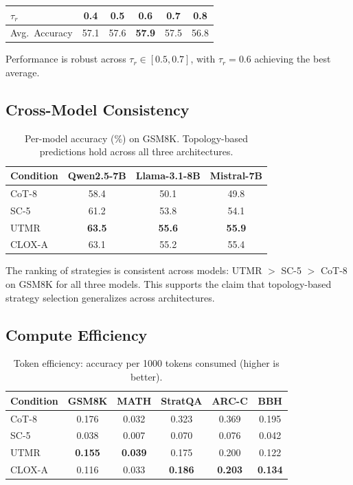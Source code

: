 \documentclass{article}
\begin{document}
\begin{center}
\small
\begin{tabular}{lccccc}
\toprule
$\tau_r$ & 0.4 & 0.5 & 0.6 & 0.7 & 0.8 \\
\midrule
Avg.\ Accuracy & 57.1 & 57.6 & \textbf{57.9} & 57.5 & 56.8 \\
\bottomrule
\end{tabular}
\end{center}

Performance is robust across $\tau_r \in [0.5, 0.7]$, with $\tau_r = 0.6$ achieving the best average.

\subsection{Cross-Model Consistency}

\begin{table}[t]
\centering
\caption{Per-model accuracy (\%) on GSM8K. Topology-based predictions hold across all three architectures.}
\label{tab:crossmodel}
\small
\begin{tabular}{lccc}
\toprule
\textbf{Condition} & \textbf{Qwen2.5-7B} & \textbf{Llama-3.1-8B} & \textbf{Mistral-7B} \\
\midrule
CoT-8 & 58.4 & 50.1 & 49.8 \\
SC-5 & 61.2 & 53.8 & 54.1 \\
UTMR & \textbf{63.5} & \textbf{55.6} & \textbf{55.9} \\
CLOX-A & 63.1 & 55.2 & 55.4 \\
\bottomrule
\end{tabular}
\end{table}

The ranking of strategies is consistent across models: UTMR $>$ SC-5 $>$ CoT-8 on GSM8K for all three models. This supports the claim that topology-based strategy selection generalizes across architectures.

\subsection{Compute Efficiency}

\begin{table}[t]
\centering
\caption{Token efficiency: accuracy per 1000 tokens consumed (higher is better).}
\label{tab:efficiency}
\small
\begin{tabular}{lccccc}
\toprule
\textbf{Condition} & \textbf{GSM8K} & \textbf{MATH} & \textbf{StratQA} & \textbf{ARC-C} & \textbf{BBH} \\
\midrule
CoT-8 & 0.176 & 0.032 & 0.323 & 0.369 & 0.195 \\
SC-5 & 0.038 & 0.007 & 0.070 & 0.076 & 0.042 \\
UTMR & \textbf{0.155} & \textbf{0.039} & 0.175 & 0.200 & 0.122 \\
CLOX-A & 0.116 & 0.033 & \textbf{0.186} & \textbf{0.203} & \textbf{0.134} \\
\bottomrule
\end{tabular}
\end{table}
\end{document}
